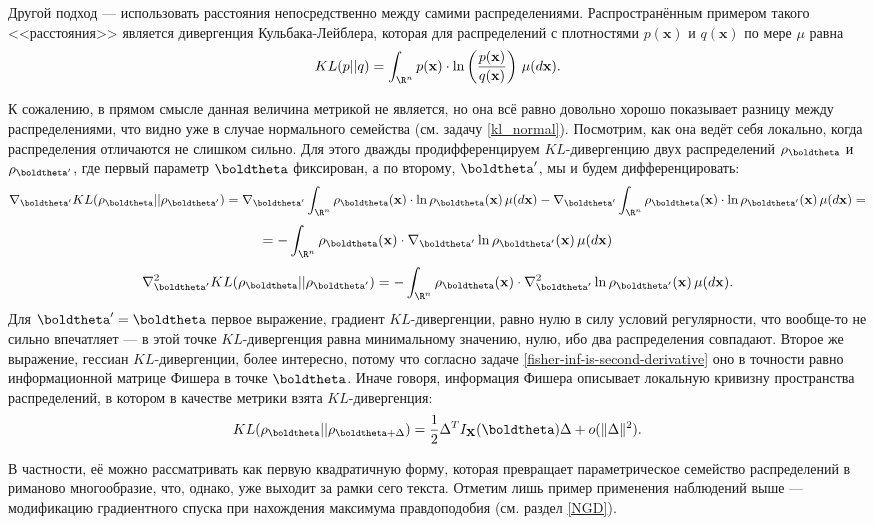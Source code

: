 Другой подход --- использовать расстояния непосредственно между самими распределениями. Распространённым примером такого <<расстояния>> является дивергенция Кульбака-Лейблера, которая для распределений с плотностями $p(\mathbf x)$ и $q(\mathbf x)$ по мере $\mu$ равна
\[
KL(p || q) = \int_{\R^n} p(\mathbf x) \cdot \ln\left(\frac{p(\mathbf x)}{q(\mathbf x)}\right)\,\mu(d\mathbf x).
\]

К сожалению, в прямом смысле данная величина метрикой не является, но она всё равно довольно хорошо показывает разницу между распределениями, что видно уже в случае нормального семейства (см. задачу \ref{kl_normal}). Посмотрим, как она ведёт себя локально, когда распределения отличаются не слишком сильно. Для этого дважды продифференцируем $KL$-дивергенцию двух распределений $\rho_{\boldtheta}$ и $\rho_{\boldtheta'}$, где первый параметр $\boldtheta$ фиксирован, а по второму, $\boldtheta'$, мы и будем дифференцировать:
\[
\nabla_{\boldtheta'} KL(\rho_{\boldtheta} || \rho_{\boldtheta'}) = \nabla_{\boldtheta'} \int_{\R^n} \rho_{\boldtheta}(\mathbf x) \cdot \ln \rho_{\boldtheta}(\mathbf x)\,\mu(d\mathbf x) - \nabla_{\boldtheta'} \int_{\R^n} \rho_{\boldtheta}(\mathbf x) \cdot \ln \rho_{\boldtheta'}(\mathbf x)\,\mu(d\mathbf x) =
\]
\[
= - \int_{\R^n} \rho_{\boldtheta}(\mathbf x) \cdot \nabla_{\boldtheta'} \ln \rho_{\boldtheta'}(\mathbf x)\,\mu(d\mathbf x)
\]
\[
\nabla^2_{\boldtheta'} KL(\rho_{\boldtheta} || \rho_{\boldtheta'}) = - \int_{\R^n} \rho_{\boldtheta}(\mathbf x) \cdot \nabla^2_{\boldtheta'} \ln \rho_{\boldtheta'}(\mathbf x)\,\mu(d\mathbf x).
\]
Для $\boldtheta'=\boldtheta$ первое выражение, градиент $KL$-дивергенции, равно нулю в силу условий регулярности, что вообще-то не сильно впечатляет --- в этой точке $KL$-дивергенция равна минимальному значению, нулю, ибо два распределения совпадают. Второе же выражение, гессиан $KL$-дивергенции, более интересно, потому что согласно задаче \ref{fisher-inf-is-second-derivative} оно в точности равно информационной матрице Фишера в точке $\boldtheta$. Иначе говоря, информация Фишера описывает локальную кривизну пространства распределений, в котором в качестве метрики взята $KL$-дивергенция:
\[
KL(\rho_{\boldtheta} || \rho_{\boldtheta + \Delta}) = \frac{1}{2} \Delta^T I_{\mathbf X}(\boldtheta) \Delta + o(\|\Delta\|^2).
\]

В частности, её можно рассматривать как первую квадратичную форму, которая превращает параметрическое семейство распределений в риманово многообразие, что, однако, уже выходит за рамки сего текста. Отметим лишь пример применения наблюдений выше --- модификацию градиентного спуска при нахождения максимума правдоподобия (см. раздел \ref{NGD}).

